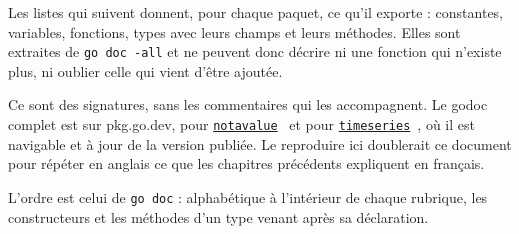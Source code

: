 Les listes qui suivent donnent, pour chaque paquet, ce qu'il exporte :
constantes, variables, fonctions, types avec leurs champs et leurs
méthodes. Elles sont extraites de \texttt{go\ doc\ -all} et ne peuvent
donc décrire ni une fonction qui n'existe plus, ni oublier celle qui
vient d'être ajoutée.

Ce sont des signatures, sans les commentaires qui les accompagnent. Le
godoc complet est sur pkg.go.dev, pour
\href{https://pkg.go.dev/github.com/fflamingodev/notavalue}{\texttt{notavalue}}~\cite{pkgnotavalue}
et pour
\href{https://pkg.go.dev/usefulrisk.com/timeseries}{\texttt{timeseries}}~\cite{pkgtimeseries},
où il est navigable et à jour de la version publiée. Le reproduire ici
doublerait ce document pour répéter en anglais ce que les chapitres
précédents expliquent en français.

L'ordre est celui de \texttt{go\ doc} : alphabétique à l'intérieur de
chaque rubrique, les constructeurs et les méthodes d'un type venant
après sa déclaration.




